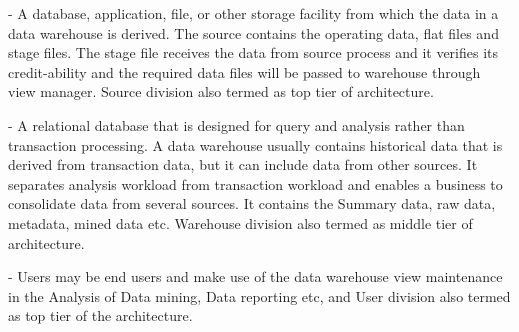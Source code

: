 \documentclass[12pt]{report}
\begin{document}
\begin{description}[font=$\bullet$~\normalfont\scshape\color{orange!50!black}]
\item [Source] - A  database,  application,  file,  or  other  storage  facility  from which  the  data  in  a  data  warehouse  is  derived.  The  source contains  the  operating  data,  flat  files  and  stage  files.  The  
stage  file  receives  the  data  from  source  process  and  it  
verifies  its  credit-ability  and  the  required  data  files  will  be  
passed   to   warehouse   through   view   manager.   Source   
division also termed as top tier of architecture. \cite{saudi}
\item[Warehouse] - A relational database that is designed for query and analysis rather   than   transaction   processing.   A   data   warehouse
usually   contains   historical   data   that   is   derived   from transaction data, but it can include data from other sources. It  separates  analysis  workload  from  transaction  workload  and  enables  a  business  to  consolidate  data  from  several
sources.  It  contains  the  Summary  data,  raw  data,  metadata,
mined  data  etc.  Warehouse  division  also  termed  as  middle
tier of architecture. \cite{saudi}
\item[User] - Users   may   be   end   users   and   make   use   of   the   data warehouse   view   maintenance   in   the   Analysis   of   Data   
mining, Data reporting etc, and User division also termed as 
top tier of the architecture. \cite{saudi}
\end{description}
\end{document}
